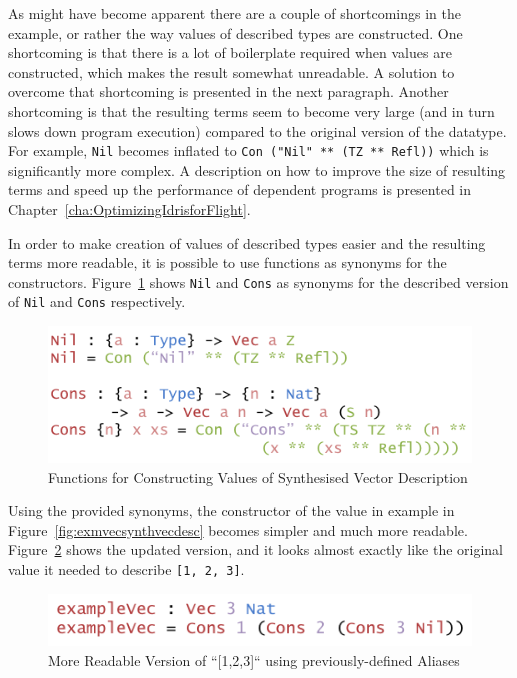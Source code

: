 \documentclass{ituthesis}
\newcommand{\ttconstructor}[1]{\textcolor{constructor-color}{\texttt{#1}}}
\newcommand{\ttdec}[1]{\textcolor{declared-var-color}{\texttt{#1}}}
\newcommand{\ttliteral}[1]{\textcolor{literal-color}{\texttt{#1}}}
\theoremstyle{definition}
\begin{document}
As might have become apparent there are a couple of shortcomings in the example, or rather the way values of described types are constructed.
One shortcoming is that there is a lot of boilerplate required when values are constructed, which makes the result somewhat unreadable.
A solution to overcome that shortcoming is presented in the next paragraph. Another shortcoming is that the resulting terms seem to become very large (and in turn slows down program execution) compared to the original
version of the datatype. For example, \ttconstructor{Nil} becomes inflated to \ttconstructor{Con~(}\ttliteral{"Nil"}~\ttconstructor{** (TZ ** Refl))} which is significantly more complex. A description on how to improve the size of resulting terms and
speed up the performance of dependent programs is presented in Chapter~\ref{cha:OptimizingIdrisforFlight}.

In order to make creation of values of described types easier and the resulting terms more readable, it is possible to use functions as synonyms for the constructors.
Figure~\ref{fig:funcconstrsynthvec} shows \ttdec{Nil} and \ttdec{Cons} as synonyms for the described version of \ttconstructor{Nil} and \ttconstructor{Cons} respectively.

\begin{figure}[ht]
\begin{center}
    \includegraphics[scale=0.5]{Figures/VectorSynthesisedConstructors.png}
\end{center}
\caption{Functions for Constructing Values of Synthesised Vector Description}
\label{fig:funcconstrsynthvec}
\end{figure}

Using the provided synonyms, the constructor of the value in example in Figure~\ref{fig:exmvecsynthvecdesc} becomes simpler and much more readable. Figure~\ref{fig:exmvecsynthvecdescconstrs} shows the updated version,
and it looks almost exactly like the original value it needed to describe \ttliteral{[1, 2, 3]}.


\begin{figure}[ht]
\begin{center}
    \includegraphics[scale=0.5]{Figures/VectorSynthesisedConstructorsExample.png}
\end{center}
\caption{More Readable Version of ``[1,2,3]`` using previously-defined Aliases}
\label{fig:exmvecsynthvecdescconstrs}
\end{figure}
\end{document}
